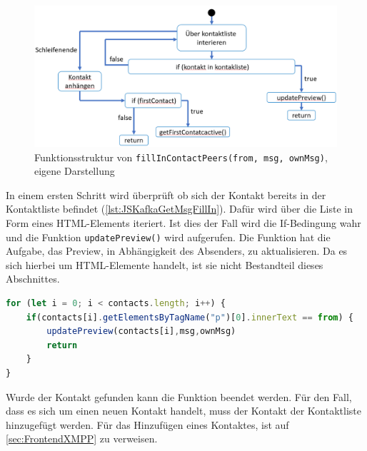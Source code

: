 \documentclass[a4paper,titlepage,halfparskip,12pt]{scrreprt}
\begin{document}
\begin{onehalfspacing}
\begin{figure}[h]
	\centering
	\includegraphics[scale=0.6]{images/fillInContactPeersKafka}
	\caption{Funktionsstruktur von \texttt{fillInContactPeers(from, msg, ownMsg)}, eigene Darstellung}
	\label{img:fillInContactPeersKafka}
\end{figure}
In einem ersten Schritt wird überprüft ob sich der Kontakt bereits in der Kontaktliste befindet (\autoref{lst:JSKafkaGetMsgFillIn}). Dafür wird über die Liste in Form eines HTML-Elements iteriert. Ist dies der Fall wird die If-Bedingung wahr und die Funktion \texttt{updatePreview()} wird aufgerufen. Die Funktion hat die Aufgabe, das Preview, in Abhängigkeit des Absenders, zu aktualisieren. Da es sich hierbei um HTML-Elemente handelt, ist sie nicht Bestandteil dieses Abschnittes.
\begin{lstlisting}[language=Javascript,caption=Überprüfung ob der Kontakt bereits in der Liste ist,label={lst:JSKafkaGetMsgFillIn}]
for (let i = 0; i < contacts.length; i++) {
	if(contacts[i].getElementsByTagName("p")[0].innerText == from) {
		updatePreview(contacts[i],msg,ownMsg)
		return
	} 
}
\end{lstlisting}
Wurde der Kontakt gefunden kann die Funktion beendet werden. Für den Fall, dass es sich um einen neuen Kontakt handelt, muss der Kontakt der Kontaktliste hinzugefügt werden. Für das Hinzufügen eines Kontaktes, ist auf \autoref{sec:FrontendXMPP} zu verweisen.\\

\end{onehalfspacing}
\end{document}
